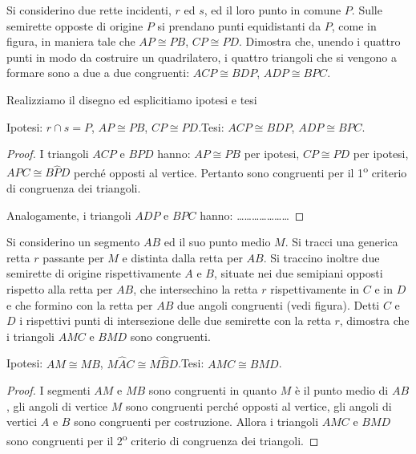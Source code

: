\begin{exrig}
\begin{esempio}
Si considerino due rette incidenti, $r$ ed $s$, ed il loro punto in comune $P$. Sulle semirette opposte di origine $P$ si prendano punti equidistanti da $P$, come in figura, in maniera tale che $AP\cong PB$, $CP\cong PD$. Dimostra che, unendo i quattro punti in modo da costruire un quadrilatero, i quattro triangoli che si vengono a formare sono a due a due congruenti: $ACP\cong BDP$, $ADP\cong BPC$.

Realizziamo il disegno ed esplicitiamo ipotesi e tesi


\noindent Ipotesi: $r\cap s=P$, $AP\cong PB$, $CP\cong PD$.\tab\tab Tesi: $ACP\cong BDP$, $ADP\cong BPC$.

\begin{proof}
I triangoli $ACP$ e $BPD$ hanno: $AP\cong PB$ per ipotesi, $CP\cong PD$ per ipotesi, $A\widehat{P}C\cong B\widehat{P}D$ perché opposti al vertice. Pertanto sono congruenti per il 1\textsuperscript{o} criterio di congruenza dei triangoli.

Analogamente, i triangoli $ADP$ e $BPC$ hanno: \ldots\ldots\ldots\ldots\ldots\ldots\ldots
\end{proof}
\end{esempio}

\begin{esempio}
Si considerino un segmento $AB$ ed il suo punto medio $M$. Si tracci una generica retta $r$ passante per $M$ e distinta dalla retta per $AB$. Si traccino inoltre due semirette di origine rispettivamente $A$ e $B$, situate nei due semipiani opposti rispetto alla retta per $AB$, che intersechino la retta $r$ rispettivamente in $C$ e in $D$ e che formino con la retta per $AB$ due angoli congruenti (vedi figura). Detti $C$ e $D$ i rispettivi punti di intersezione delle due semirette con la retta $r$, dimostra che i triangoli $AMC$ e $BMD$ sono congruenti.


\noindent Ipotesi: $AM\cong MB$, $M\widehat{A}C\cong M\widehat{B}D$.\tab Tesi: $AMC\cong BMD$.

\begin{proof}
I segmenti $AM$ e $MB$ sono congruenti in quanto $M$ è il punto medio di $AB$, gli angoli di vertice $M$ sono congruenti perché opposti al vertice, gli angoli di vertici $A$ e $B$ sono congruenti per costruzione. Allora i triangoli $AMC$ e $BMD$ sono congruenti per il 2\textsuperscript{o} criterio di congruenza dei triangoli.
\end{proof}
\end{esempio}
\end{exrig}


